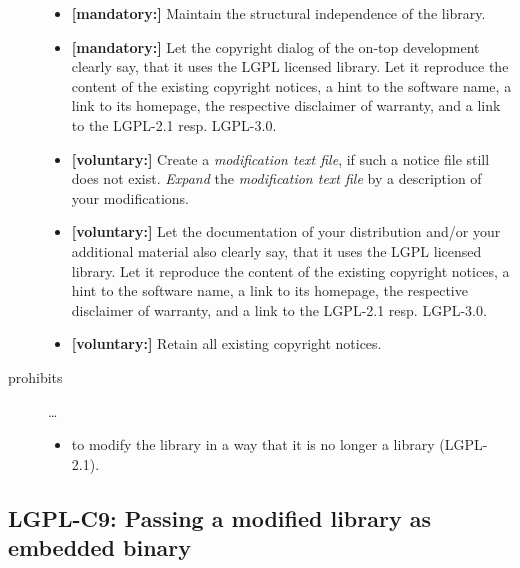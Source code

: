 \begin{description}
\begin{itemize}
  \item \textbf{[mandatory:]}  Maintain the structural independence of the
  library.
   
  \item \textbf{[mandatory:]} Let the copyright dialog of the on-top development
  clearly say, that it uses the LGPL licensed library. Let it reproduce the
  content of the existing copyright notices, a hint to the software name, a link
  to its homepage, the respective disclaimer of warranty, and a link to the
  LGPL-2.1 resp. LGPL-3.0.
     
  \item \textbf{[voluntary:]} Create a \emph{modification text file}, if such a
  notice file still does not exist. \emph{Expand} the \emph{modification text
  file} by a description of your modifications.
  
 \item \textbf{[voluntary:]} Let the documentation of your distribution and/or
  your additional material also clearly say, that it uses the LGPL licensed
  library. Let it reproduce the content of the existing copyright notices, a
  hint to the software name, a link to its homepage, the respective disclaimer
  of warranty, and a link to the LGPL-2.1 resp. LGPL-3.0.
  
  \item \textbf{[voluntary:]} Retain all existing copyright notices.
  
\end{itemize}

\item[prohibits] \ldots
\begin{itemize}
  \item to modify the library in a way that it is no longer a library
  (LGPL-2.1).
\end{itemize}

\end{description}


\subsection{LGPL-C9: Passing a modified library as embedded binary}
\label{OSUC-10B-LGPL}

